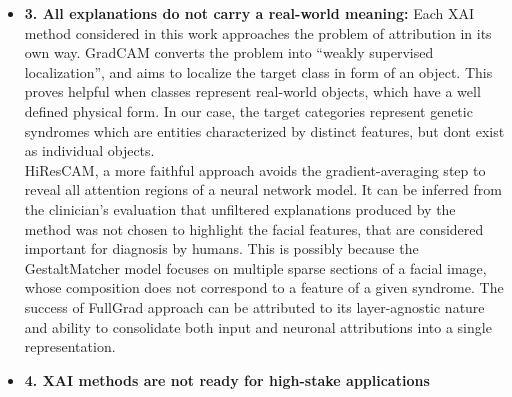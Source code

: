 \documentclass[../report.tex]{subfiles}
\begin{document}
\begin{itemize}
    	\item{\textbf{3. All explanations do not carry a real-world meaning:}} Each XAI method considered in this work approaches the problem of attribution in its own way. GradCAM converts the problem into \enquote{weakly supervised localization}, and aims to localize the target class in form of an object. This proves helpful when classes represent real-world objects, which have a well defined physical form. In our case, the target categories represent genetic syndromes which are entities characterized by distinct features, but dont exist as individual objects.\\ 
    	HiResCAM, a more faithful approach avoids the gradient-averaging step to reveal all attention regions of a neural network model. It can be inferred from the clinician's evaluation that unfiltered explanations produced by the method was not chosen to highlight the facial features, that are considered important for diagnosis by humans. This is possibly because the GestaltMatcher model focuses on multiple sparse sections of a facial image, whose composition does not correspond to a feature of a given syndrome. The success of FullGrad approach can be attributed to its layer-agnostic nature and ability to consolidate both input and neuronal attributions into a single representation.
    	
    	\item{\textbf{4. XAI methods are not ready for high-stake applications}} 
    \end{itemize} 
	
\end{document}
